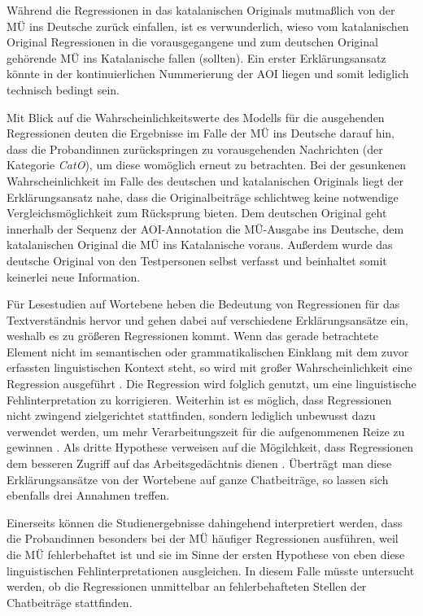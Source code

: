 Während die Regressionen in das katalanischen Originals mutmaßlich von der MÜ ins Deutsche zurück einfallen, ist es verwunderlich, wieso vom katalanischen Original Regressionen in die vorausgegangene und zum deutschen Original gehörende MÜ ins Katalanische fallen (sollten). Ein erster Erklärungsansatz könnte in der kontinuierlichen Nummerierung der AOI liegen und somit lediglich technisch bedingt sein. 

Mit Blick auf die Wahrscheinlichkeitswerte des Modells für die ausgehenden Regressionen deuten die Ergebnisse im Falle der MÜ ins Deutsche darauf hin, dass die Proband{\textperiodcentered}innen zurückspringen zu vorausgehenden Nachrichten (der Kategorie \emph{CatO}), um diese womöglich erneut zu betrachten. Bei der gesunkenen Wahrscheinlichkeit im Falle des deutschen und katalanischen Originals liegt der Erklärungsansatz nahe, dass die Originalbeiträge schlichtweg keine notwendige Vergleichsmöglichkeit zum Rücksprung bieten. Dem deutschen Original geht innerhalb der Sequenz der AOI-Annotation die MÜ-Ausgabe ins Deutsche, dem katalanischen Original die MÜ ins Katalanische voraus. Außerdem wurde das deutsche Original von den Testpersonen selbst verfasst und beinhaltet somit keinerlei neue Information.

Für Lesestudien auf Wortebene heben \citeauthor{inhoff_regressions_2019} die Bedeutung von Regressionen für das Textverständnis hervor und gehen dabei auf verschiedene Erklärungsansätze ein, weshalb es zu größeren Regressionen kommt. Wenn das gerade betrachtete Element nicht im semantischen oder grammatikalischen Einklang mit dem zuvor erfassten linguistischen Kontext steht, so wird mit großer Wahrscheinlichkeit eine Regression ausgeführt \citep[3]{inhoff_regressions_2019}. Die Regression wird folglich genutzt, um eine linguistische Fehlinterpretation zu korrigieren. Weiterhin ist es möglich, dass Regressionen nicht zwingend zielgerichtet stattfinden, sondern lediglich unbewusst dazu verwendet werden, um mehr Verarbeitungszeit für die aufgenommenen Reize zu gewinnen \citep[3\psq]{inhoff_regressions_2019}. Als dritte Hypothese verweisen \citeauthor{inhoff_regressions_2019} auf die Mögilchkeit, dass Regressionen dem besseren Zugriff auf das Arbeitsgedächtnis dienen \citep[4]{inhoff_regressions_2019}. Überträgt man diese Erklärungsansätze von der Wortebene auf ganze Chatbeiträge, so lassen sich ebenfalls drei Annahmen treffen.

Einerseits können die Studienergebnisse dahingehend interpretiert werden, dass die Proband{\textperiodcentered}innen besonders bei der MÜ häufiger Regressionen ausführen, weil die MÜ fehlerbehaftet ist und sie im Sinne der ersten Hypothese von \citeauthor{inhoff_regressions_2019} eben diese linguistischen Fehlinterpretationen ausgleichen. In diesem Falle müsste untersucht werden, ob die Regressionen unmittelbar an fehlerbehafteten Stellen der Chatbeiträge stattfinden.


